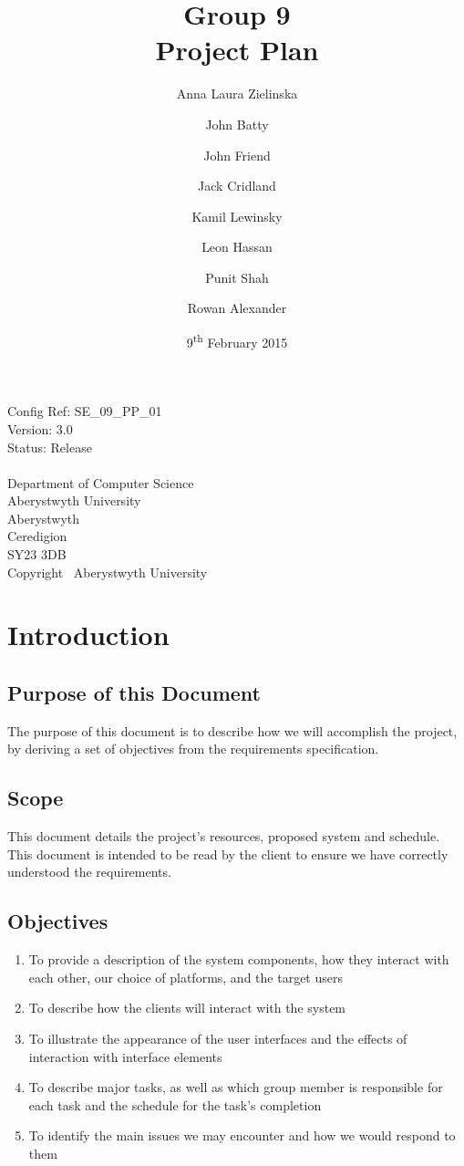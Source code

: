 \documentclass[12pt]{article}
\title{Group 9 \protect\\ Project Plan}
\author{Anna Laura Zielinska \and John Batty \and John Friend \and Jack Cridland \and Kamil Lewinsky \and Leon Hassan \and Punit Shah \and Rowan Alexander}
\date{9\textsuperscript{th} February 2015}
\begin{document}
\maketitle
\thispagestyle{headerfooter}
\pagestyle{headerfooter}

\begin{center}
	Config Ref: SE\_09\_PP\_01\\
	Version: 3.0\\
	Status: Release\\
	~\\
	Department of Computer Science\\
	Aberystwyth University\\
	Aberystwyth\\
	Ceredigion\\
	SY23 3DB\\
	Copyright \textcopyright~Aberystwyth University
\end{center}

\clearpage

\tableofcontents
\clearpage

\section{Introduction}

	\subsection{Purpose of this Document}
		The purpose of this document is to describe how we will accomplish the project, by deriving a set of objectives from the requirements specification.
	\subsection{Scope}
		This document details the project's resources, proposed system and schedule.\\
		This document is intended to be read by the client to ensure we have correctly understood the requirements.
	\subsection{Objectives}
		\begin{enumerate}
			\item To provide a description of the system components, how they interact with each other, our choice of platforms, and the target users
			\item To describe how the clients will interact with the system
			\item To illustrate the appearance of the user interfaces and the effects of interaction with interface elements
			\item To describe major tasks, as well as which group member is responsible for each task and the schedule for the task's completion
			\item To identify the main issues we may encounter and how we would respond to them
		\end{enumerate}
\end{document}
